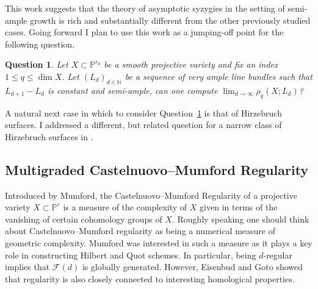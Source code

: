 \documentclass[11pt,reqno]{amsart}
\newtheorem{question}[lemma]{Question}
\theoremstyle{remark}
\newcommand{\cF}{\mathcal{F}}
\newcommand{\N}{\mathbb{N}}
\renewcommand{\P}{\mathbb{P}}
\begin{document}
This work suggests that the theory of asymptotic syzygies in the setting of semi-ample growth is rich and substantially different from the other previously studied cases. Going forward I plan to use this work as a jumping-off point for the following question.  

\begin{question}\label{quest:semi-ample}
Let $X\subset \P^{r_d}$ be a smooth projective variety and fix an index $1\leq q \leq \dim X$. Let $(L_{d})_{d\in\N}$ be a sequence of very ample line bundles such that $L_{d+1}-L_{d}$ is constant and semi-ample, can one compute $\lim_{d\to\infty} \rho_{q}\left(X;L_{d}\right)$?
\end{question}

A natural next case in which to consider Question~\ref{quest:semi-ample} is that of Hirzebruch surfaces. I addressed a different, but related question for a narrow class of Hirzebruch surfaces in \cite{bruce19-hirzebruch}.

%
%

\subsection{Multigraded Castelnuovo–Mumford Regularity}\label{subsec:prior-mgreg}

Introduced by Mumford, the Castelnuovo–Mumford Regularity of a projective variety $X\subset \P^{r}$ is a measure of the complexity of $X$ given in terms of the vanishing of certain cohomology groups of $X$. Roughly speaking one should think about Castelnuovo--Mumford regularity as being a numerical measure of geometric complexity. Mumford was interested in such a measure as it plays a key role in constructing Hilbert and Quot schemes. In particular, being $d$-regular implies that $\cF(d)$ is globally generated. However, Eisenbud and Goto showed that regularity is also closely connected to interesting homological properties.
\end{document}
